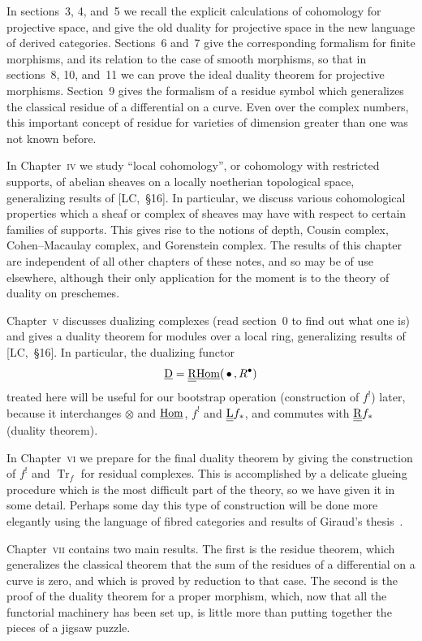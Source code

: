 In sections~3, 4, and~5 we recall the explicit calculations of cohomology for projective space, and give the old duality for projective space in the new language of derived categories. Sections~6 and~7 give the corresponding formalism for finite morphisms, and its relation to the case of smooth morphisms, so that in sections~8, 10, and~11 we can prove the ideal duality theorem for projective morphisms. Section~9 gives the formalism of a residue symbol which generalizes the classical residue of a differential on a curve. Even over the complex numbers, this important concept of residue for varieties of dimension greater than one was not known before.

In Chapter~\textsc{iv} we study ``local cohomology'', or cohomology with restricted supports, of abelian sheaves on a locally noetherian topological space, generalizing results of [LC,~\S16]. In particular, we discuss various cohomological properties which a sheaf or complex of sheaves may have with respect to certain families of supports. This gives rise to the notions of depth, Cousin complex, Cohen–Macaulay complex, and Gorenstein complex. The results of this chapter are independent of all other chapters of these notes, and so may be of use elsewhere, although their only application for the moment is to the theory of duality on preschemes.

Chapter~\textsc{v} discusses dualizing complexes (read section~0 to find out what one is) and gives a duality theorem for modules over a local ring, generalizing results of [LC,~\S16]. In particular, the dualizing functor
\[
\underline{\operatorname{D}} = \underline{\underline{\operatorname{R}}}\underline{\operatorname{Hom}}(\,\bullet\,, R^{\bullet})
\]
treated here will be useful for our bootstrap operation (construction of $f^{!}$) later, because it interchanges $\otimes$ and $\underline{\operatorname{Hom}}$, $f^{!}$ and $\underline{\underline{\operatorname{L}}} f_{*}$, and commutes with $\underline{\underline{\operatorname{R}}} f_{*}$ (duality theorem).

In Chapter~\textsc{vi} we prepare for the final duality theorem by giving the construction of $f^{!}$ and $\operatorname{Tr}_{f}$ for residual complexes. This is accomplished by a delicate glueing procedure which is the most difficult part of the theory, so we have given it in some detail. Perhaps some day this type of construction will be done more elegantly using the language of fibred categories and results of Giraud's thesis~\cite{6}.

Chapter~\textsc{vii} contains two main results. The first is the residue theorem, which generalizes the classical theorem that the sum of the residues of a differential on a curve is zero, and which is proved by reduction to that case. The second is the proof of the duality theorem for a proper morphism, which, now that all the functorial machinery has been set up, is little more than putting together the pieces of a jigsaw puzzle.

